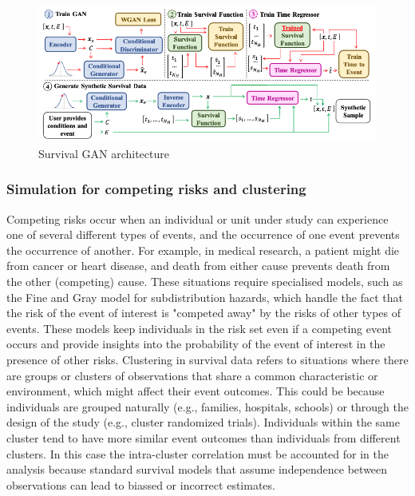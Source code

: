 \begin{figure}
	\includegraphics[scale=0.51]{Figures/GAN_ARCH.png}
	\caption{\parencite{norcliffe_survivalgan_2023} Survival GAN architecture}
\end{figure}

\subsubsection{Simulation for competing risks and clustering}
Competing risks occur when an individual or unit under study can experience one of several different types of events, and the occurrence of one event prevents the occurrence of another. For example, in medical research, a patient might die from cancer or heart disease, and death from either cause prevents death from the other (competing) cause. These situations require specialised models, such as the Fine and Gray model \parencite{meng_simulating_2023} for subdistribution hazards, which handle the fact that the risk of the event of interest is "competed away" \parencite{meng_simulating_2023} by the risks of other types of events. These models keep individuals in the risk set even if a competing event occurs and provide insights into the probability of the event of interest in the presence of other risks. Clustering in survival data refers to situations where there are groups or clusters of observations that share a common characteristic or environment, which might affect their event outcomes. This could be because individuals are grouped naturally (e.g., families, hospitals, schools) or through the design of the study (e.g., cluster randomized trials). Individuals within the same cluster tend to have more similar event outcomes than individuals from different clusters. In this case the intra-cluster correlation must be accounted for in the analysis because standard survival models that assume independence between observations can lead to biassed or incorrect estimates.
